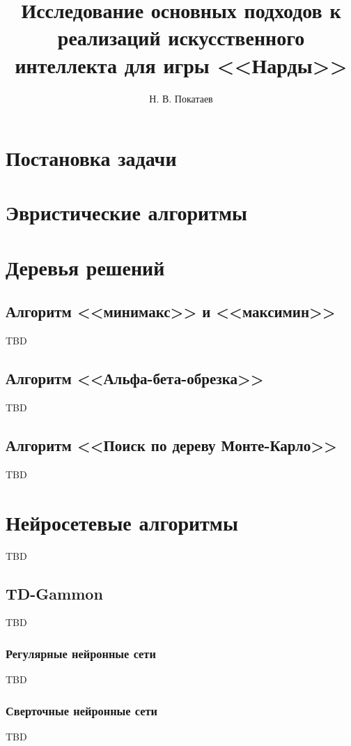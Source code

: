 \documentclass{ammstudconf}
\title{Исследование основных подходов к реализаций искусственного интеллекта для игры <<Нарды>>}
\author{Н. В. Покатаев}
\begin{document}
\maketitle



\section{Постановка задачи}


\section{Эвристические алгоритмы}


\section{Деревья решений}


\subsection{Алгоритм <<минимакс>> и <<максимин>>}
TBD

\subsection{Алгоритм <<Альфа-бета-обрезка>>}
TBD

\subsection{Алгоритм <<Поиск по дереву Монте-Карло>>}
TBD

\section{Нейросетевые алгоритмы}
TBD

\subsection{TD-Gammon}
TBD

\subsubsection{Регулярные нейронные сети}
TBD

\subsubsection{Сверточные нейронные сети}
TBD
\end{document}
